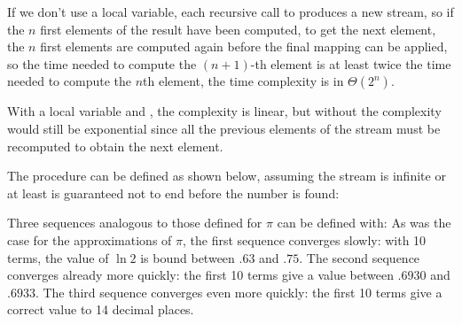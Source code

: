 \begin{exe}[3.63]
    If we don’t use a local variable, each recursive call to  
    produces a new stream, so if the $n$ first elements of the result have been 
    computed, to get the next element, the $n$ first elements are computed again 
    before the final mapping can be applied, so the time needed to compute the 
    $(n + 1)$-th element is at least twice the time needed to compute the $n$th 
    element, the time complexity is in $\Theta(2^n)$.

    With a local variable and , the complexity is linear, but 
    without  the complexity would still be exponential since all 
    the previous elements of the stream must be recomputed to obtain the next 
    element.
\end{exe}

\begin{exe}[3.64]
    The procedure  can be defined as shown below, assuming 
    the stream is infinite or at least is guaranteed not to end before the 
    number is found:
\end{exe}

\begin{exe}[3.65]
    Three sequences analogous to those defined for $\pi$ can be defined with:
    As was the case for the approximations of $\pi$, the first sequence 
    converges slowly: with 10 terms, the value of $\ln 2$ is bound between $.63$ 
    and $.75$. The second sequence converges already more quickly: the first 10 
    terms give a value between $.6930$ and $.6933$. The third sequence converges 
    even more quickly: the first 10 terms give a correct value to 14 decimal 
    places.
\end{exe}

